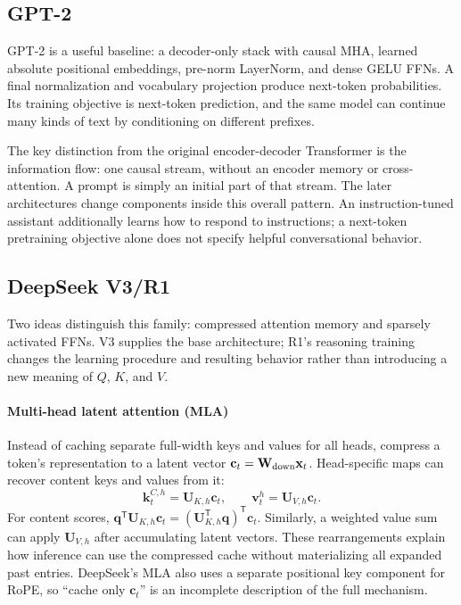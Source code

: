 \documentclass[11pt, oneside]{book}
\newcommand{\T}{^{\mathsf{T}}}           %
\let\originalsubsection\subsection
\renewcommand{\subsection}{\Needspace{6\baselineskip}\originalsubsection}
\begin{document}
\subsection{GPT-2}\label{sec:source-5-4-1}
GPT-2 is a useful baseline: a decoder-only stack with causal MHA, learned absolute positional embeddings, pre-norm LayerNorm, and dense GELU FFNs. A final normalization and vocabulary projection produce next-token probabilities. Its training objective is next-token prediction, and the same model can continue many kinds of text by conditioning on different prefixes.

The key distinction from the original encoder-decoder Transformer is the information flow: one causal stream, without an encoder memory or cross-attention. A prompt is simply an initial part of that stream. The later architectures change components inside this overall pattern. An instruction-tuned assistant additionally learns how to respond to instructions; a next-token pretraining objective alone does not specify helpful conversational behavior.

\subsection{DeepSeek V3/R1}\label{sec:source-5-4-2}
Two ideas distinguish this family: compressed attention memory and sparsely activated FFNs. V3 supplies the base architecture; R1's reasoning training changes the learning procedure and resulting behavior rather than introducing a new meaning of $Q$, $K$, and $V$.

\paragraph{Multi-head latent attention (MLA)} Instead of caching separate full-width keys and values for all heads, compress a token's representation to a latent vector $\mathbf{c}_t=\mathbf{W}_{\rm down}\mathbf{x}_t$. Head-specific maps can recover content keys and values from it:
\[
 \mathbf{k}^{C,h}_t=\mathbf{U}_{K,h}\mathbf{c}_t,\qquad
 \mathbf{v}^{h}_t=\mathbf{U}_{V,h}\mathbf{c}_t.
\]
For content scores, $\mathbf{q}\T\mathbf{U}_{K,h}\mathbf{c}_t=(\mathbf{U}_{K,h}\T\mathbf{q})\T\mathbf{c}_t$. Similarly, a weighted value sum can apply $\mathbf{U}_{V,h}$ after accumulating latent vectors. These rearrangements explain how inference can use the compressed cache without materializing all expanded past entries. DeepSeek's MLA also uses a separate positional key component for RoPE, so ``cache only $\mathbf{c}_t$'' is an incomplete description of the full mechanism.
\end{document}

